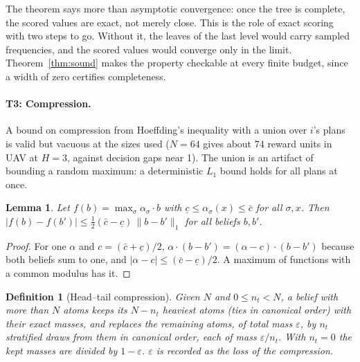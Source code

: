 \documentclass{article}
\newtheorem{lemma}{Lemma}
\newtheorem{definition}{Definition}
\begin{document}
The theorem says more than asymptotic convergence: once the tree is complete, the scored values are exact, not merely close. This is the role of exact scoring with two steps to go. Without it, the leaves of the last level would carry sampled frequencies, and the scored values would converge only in the limit. Theorem~\ref{thm:sound} makes the property checkable at every finite budget, since a width of zero certifies completeness.

\paragraph{T3: Compression.} A bound on compression from Hoeffding's inequality with a union over $i$'s plans is valid but vacuous at the sizes used ($N = 64$ gives about 74 reward units in UAV at $H = 3$, against decision gaps near 1). The union is an artifact of bounding a random maximum: a deterministic $L_1$ bound holds for all plans at once.

\begin{lemma}\label{lem:l1}
Let $f(b)=\max_\sigma\alpha_\sigma\cdot b$ with $\underline c\le\alpha_\sigma(x)\le\bar c$ for all $\sigma,x$.
Then $|f(b)-f(b')|\le\frac12(\bar c-\underline c)\,\|b-b'\|_1$ for all beliefs $b,b'$.
\end{lemma}
\begin{proof}
For one $\alpha$ and $c=(\bar c+\underline c)/2$, $\alpha\cdot(b-b')=(\alpha-c)\cdot(b-b')$ because both beliefs
sum to one, and $|\alpha-c|\le(\bar c-\underline c)/2$. A maximum of functions with a common modulus has it.
\end{proof}

\begin{definition}[Head--tail compression]
Given $N$ and $0\le n_t<N$, a belief with more than $N$ atoms keeps its $N-n_t$ heaviest atoms (ties in
canonical order) with their exact masses, and replaces the remaining atoms, of total mass $\varepsilon$, by
$n_t$ stratified draws from them in canonical order, each of mass $\varepsilon/n_t$. With $n_t=0$ the kept
masses are divided by $1-\varepsilon$. $\varepsilon$ is recorded as the \emph{loss} of the compression.
\end{definition}
\end{document}
